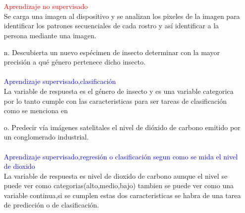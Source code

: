 \documentclass[9pt,letterpaper]{article}\usepackage[]{graphicx}\usepackage[]{color}
\begin{document}
\begin{enumerate}
\\ \\
\textcolor{red}{Aprendizaje no supervisado}\\ Se carga una imagen al dispositivo y se analizan los pixeles de la imagen para identificar los patrones secuenciales de cada rostro y así identificar a la persona mediante una imagen.
                \item[n.]  Descubierta un nuevo espécimen de insecto determinar con la mayor precisión a qué género
pertenece dicho insecto.
\\ \\
\textcolor{blue}{Aprendizaje supervisado,clasificación}\\
La variable de respuesta es el género de insecto y es una variable categorica por lo tanto cumple con las caracteristicas para ser tareas de clasificación como se menciona en \cite{ramos_aprendizaje_2019}
 \item[o.]  Predecir vía imágenes satelitales el nivel de dióxido de carbono emitido por un conglomerado
industrial.
\\ \\
\textcolor{blue}{Aprendizaje supervisado,regresión o clasificación segun como se mida el nivel de dioxido}\\
La variable de respuesta es nivel de dioxido de carbono aunque el nivel se puede ver como categorias(alto,medio,bajo) tambien se puede ver como una variable continua,si se cumplen estas dos caracteristicas se habra de una tarea de predicción o de clasificación.

                        
\end{enumerate}


\end{document}

